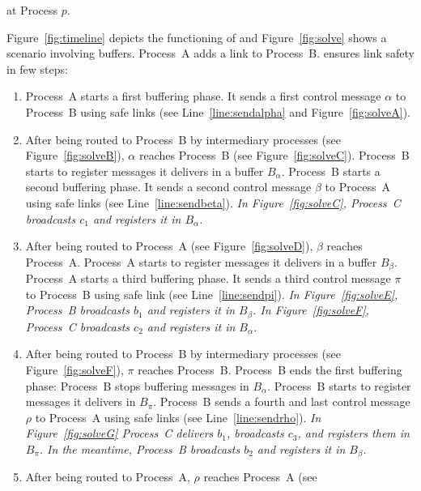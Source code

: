 \begin{algorithm}[h]
  
  \caption{\label{algo:rpcbroadcast}\RPCBROADCAST at Process $p$.}
\end{algorithm}


Figure~\ref{fig:timeline} depicts the functioning of \RPCBROADCAST and
Figure~\ref{fig:solve} shows a scenario involving buffers.  Process~A adds a link to
Process~B. \RPCBROADCAST ensures link safety in few steps:

\begin{enumerate}[leftmargin=*]
\item Process~A starts a first buffering phase. It sends a first control message
  $\alpha$ to Process~B using safe links (see Line~\ref{line:sendalpha} and
  Figure~\ref{fig:solveA}).
\item After being routed to Process~B by intermediary processes (see
  Figure~\ref{fig:solveB}), $\alpha$ reaches Process~B (see
  Figure~\ref{fig:solveC}).  Process~B starts to register messages it delivers
  in a buffer $B_\alpha$.  Process~B starts a second buffering phase. It sends a
  second control message $\beta$ to Process~A using safe links (see
  Line~\ref{line:sendbeta}). \emph{In Figure~\ref{fig:solveC}, Process~C
    broadcasts $c_1$ and registers it in $B_\alpha$.}
\item After being routed to Process~A (see Figure~\ref{fig:solveD}), $\beta$
  reaches Process~A. Process~A starts to register messages it delivers in a
  buffer $B_\beta$. Process~A starts a third buffering phase. It sends a third
  control message $\pi$ to Process~B using safe link (see
  Line~\ref{line:sendpi}). \emph{In Figure~\ref{fig:solveE}, Process~B
    broadcasts $b_1$ and registers it in $B_\beta$. In Figure~\ref{fig:solveF},
    Process~C broadcasts $c_2$ and registers it in $B_\alpha$.}
\item After being routed to Process~B by intermediary processes (see
  Figure~\ref{fig:solveF}), $\pi$ reaches Process~B. Process~B ends the first
  buffering phase: Process~B stops buffering messages in $B_\alpha$.  Process~B
  starts to register messages it delivers in $B_\pi$.  Process~B sends a fourth
  and last control message $\rho$ to Process~A using safe links (see
  Line~\ref{line:sendrho}). \emph{In Figure~\ref{fig:solveG} Process~C delivers
    $b_1$, broadcasts $c_3$, and registers them in $B_\pi$. In the meantime,
    Process~B broadcasts $b_2$ and registers it in $B_\beta$.}
\item After being routed to Process~A, $\rho$ reaches Process~A (see

\end{enumerate}
